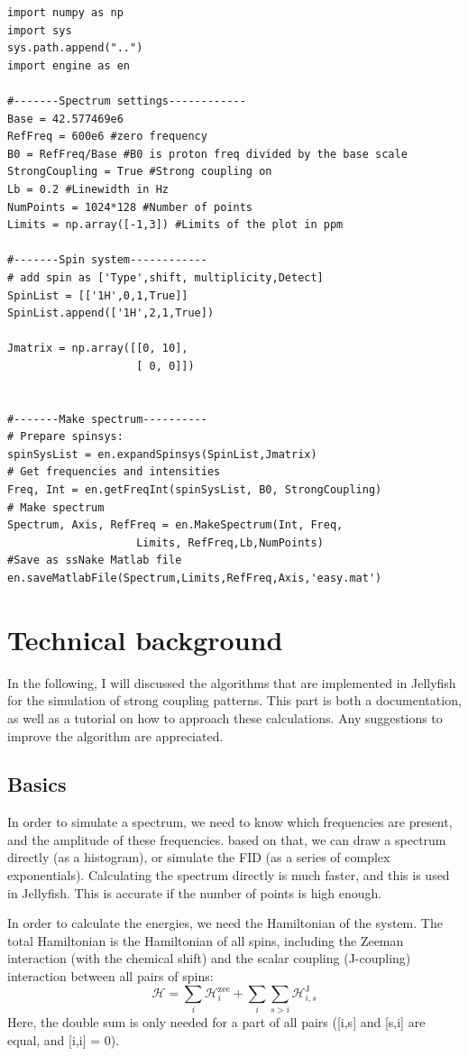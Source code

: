 \documentclass[11pt,a4paper]{article}
\begin{document}
\lstset{language=python} 
\begin{lstlisting}[frame=single]  
import numpy as np
import sys
sys.path.append("..")
import engine as en

#-------Spectrum settings------------
Base = 42.577469e6
RefFreq = 600e6 #zero frequency
B0 = RefFreq/Base #B0 is proton freq divided by the base scale
StrongCoupling = True #Strong coupling on
Lb = 0.2 #Linewidth in Hz
NumPoints = 1024*128 #Number of points
Limits = np.array([-1,3]) #Limits of the plot in ppm

#-------Spin system------------
# add spin as ['Type',shift, multiplicity,Detect]
SpinList = [['1H',0,1,True]] 
SpinList.append(['1H',2,1,True])

Jmatrix = np.array([[0, 10],
                    [ 0, 0]])


#-------Make spectrum----------
# Prepare spinsys:
spinSysList = en.expandSpinsys(SpinList,Jmatrix) 
# Get frequencies and intensities
Freq, Int = en.getFreqInt(spinSysList, B0, StrongCoupling) 
# Make spectrum
Spectrum, Axis, RefFreq = en.MakeSpectrum(Int, Freq, 
					Limits, RefFreq,Lb,NumPoints) 
#Save as ssNake Matlab file
en.saveMatlabFile(Spectrum,Limits,RefFreq,Axis,'easy.mat')
\end{lstlisting}

\section{Technical background}
In the following, I will discussed the algorithms that are implemented in Jellyfish for
the simulation of strong coupling patterns. This part is both a documentation, as well as
a tutorial on how to approach these calculations. Any suggestions to improve the algorithm
are appreciated.

\subsection{Basics}
In order to simulate a spectrum, we need to know which frequencies are present, and the
amplitude of these frequencies. based on that, we can draw a spectrum directly (as a
histogram), or simulate the FID (as a series of complex exponentials). Calculating the
spectrum directly is much faster, and this is used in Jellyfish. This is accurate if the
number of points is high enough.

In order to calculate the energies, we need the Hamiltonian of the system. The total
Hamiltonian is the Hamiltonian of all spins, including the Zeeman interaction (with the
chemical shift) and the scalar coupling (J-coupling) interaction between all pairs of
spins:
\begin{equation}
  \mathcal{H} = \sum_{i}{\mathcal{H}_{i}^\text{zee}} + \sum_{i}\sum_{s>i}{\mathcal{H}_{i,s}^\text{J}}
\end{equation}
Here, the double sum is only needed for a part of all pairs ([i,s] and [s,i] are equal,
and [i,i] = 0).
\end{document}
